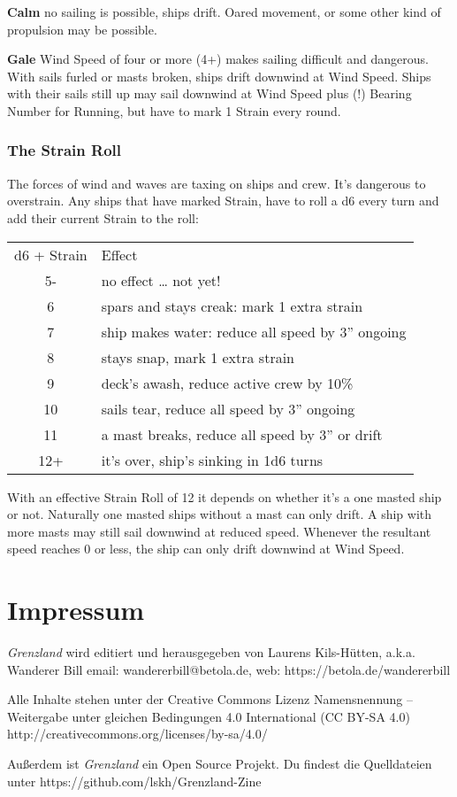 \documentclass[11pt]{wbzine}
\begin{document}
\begin{multicols}{2}
\textbf{Calm} no sailing is possible, ships drift. Oared movement, or
some other kind of propulsion may be possible.

\textbf{Gale} Wind Speed of four or more (4+) makes sailing difficult
and dangerous. With sails furled or masts broken, ships drift downwind
at Wind Speed. Ships with their sails still up may sail downwind at Wind
Speed plus (!) Bearing Number for Running, but have to mark 1 Strain
every round.

\subsubsection{The Strain Roll}

The forces of wind and waves are taxing on ships and crew. It's
dangerous to overstrain. Any ships that have marked Strain, have to roll
a d6 every turn and add their current Strain to the roll:

\begin{tabularx}{\columnwidth}{cZ}
d6 + Strain & Effect \\
5- & no effect \ldots{} not yet! \\
6 & spars and stays creak: mark 1 extra strain \\
7 & ship makes water: reduce all speed by 3'' ongoing \\
8 & stays snap, mark 1 extra strain \\
9 & deck's awash, reduce active crew by 10\% \\
10 & sails tear, reduce all speed by 3'' ongoing \\
11 & a mast breaks, reduce all speed by 3'' or drift \\
12+ & it's over, ship's sinking in 1d6 turns \\
\end{tabularx}

With an effective Strain Roll of 12 it depends on whether it's a one
masted ship or not. Naturally one masted ships without a mast can only
drift. A ship with more masts may still sail downwind at reduced speed.
Whenever the resultant speed reaches 0 or less, the ship can only drift
downwind at Wind Speed.

\end{multicols}




\section{Impressum}

\textit{Grenzland} wird editiert und
herausgegeben von Laurens Kils-Hütten,
a.k.a. Wanderer Bill
email: wandererbill@betola.de, web: https://betola.de/wandererbill

Alle Inhalte stehen unter der Creative Commons Lizenz
Namensnennung -- Weitergabe unter gleichen Bedingungen 4.0 International (CC BY-SA 4.0)\\
http://creativecommons.org/licenses/by-sa/4.0/

Außerdem ist \textit{Grenzland} ein Open Source Projekt. Du
findest die Quelldateien unter 
https://github.com/lskh/Grenzland-Zine

\end{document}
